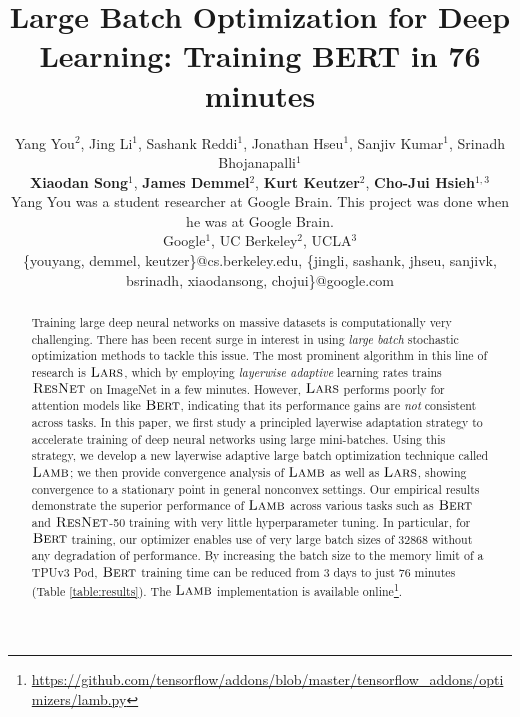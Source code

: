 \documentclass{article} %
\title{Large Batch Optimization for Deep Learning: Training BERT in 76 minutes}
\author{\small Yang You$^{2}$, 
Jing Li$^{1}$, Sashank Reddi$^{1}$, Jonathan Hseu$^{1}$, Sanjiv Kumar$^{1}$, Srinadh Bhojanapalli$^{1}$\\{\bf \small Xiaodan Song}$^{1}$, {\bf \small James Demmel}$^{2}$, {\bf \small Kurt Keutzer}$^{2}$, {\bf \small Cho-Jui Hsieh}$^{1,3}$\\
{\scriptsize Yang You was a student researcher at Google Brain. This project was done when he was at Google Brain.}
\\
\normalsize{Google$^{1}$},
\normalsize{UC Berkeley$^{2}$},
\normalsize{UCLA$^{3}$}\\
\scriptsize{\{youyang, demmel, keutzer\}@cs.berkeley.edu, \{jingli, sashank, jhseu, sanjivk, bsrinadh, xiaodansong, chojui\}@google.com}
}
\newcommand{\resnet}{\textsc{ResNet}}
\newcommand{\bert}{\textsc{Bert}\xspace}
\newcommand{\lamb}{\textsc{Lamb}}
\newcommand{\lars}{\textsc{Lars}}
\begin{document}
\maketitle

\begin{abstract}
Training large deep neural networks on massive datasets is  computationally very challenging. There has been recent surge in interest in using \emph{large batch} stochastic optimization methods to tackle this issue. The most prominent algorithm in this line of research is $\lars$, which by  employing \emph{layerwise adaptive} learning rates trains $\resnet$ on ImageNet in a few minutes. However, $\lars$ performs poorly for attention models like $\bert$, indicating that its performance gains are \emph{not} consistent across tasks. In this paper, we first study a principled layerwise adaptation strategy to accelerate training of deep neural networks using large mini-batches. Using this strategy, we develop a new layerwise adaptive large batch optimization technique called $\lamb$; we then provide convergence analysis of $\lamb$ as well as $\lars$, showing convergence to a stationary point in general nonconvex settings. Our empirical results demonstrate the superior performance of $\lamb$ across various tasks such as $\bert$ and $\resnet$-50 training with very little hyperparameter tuning. In particular, for $\bert$ training, our optimizer enables use of very large batch sizes of 32868 without any degradation of performance.  By increasing the batch size to the memory limit of a TPUv3 Pod, $\bert$ training time can be reduced from 3 days to just 76 minutes (Table \ref{table:results}). The $\lamb$ implementation is available online\footnote{\url{https://github.com/tensorflow/addons/blob/master/tensorflow_addons/optimizers/lamb.py}}.
\end{abstract}

\iffalse
Training large deep neural networks on massive datasets is  computationally very challenging. There has been recent surge in interest in using \emph{large batch} stochastic optimization methods to tackle this issue. The use of large batch of gradients (which are computed in parallel) in these methods enable them to use much larger learning rates, thereby, drastically reducing the training time. However, current methods require extensive tuning of learning rates and their performance gains are \emph{not} consistent across tasks. In this paper, we study a principled adaptation strategy to accelerate training of deep neural networks using large mini-batches. Using this strategy, we develop a new layer-wise adaptive large batch optimization technique called $\lamb$. We provide a formal convergence analysis of $\lamb$ as well as the previous published layerwise optimizer $\lars$, showing convergence to a stationary point in general nonconvex settings. Our empirical results demonstrate the superior performance of $\lamb$ across various tasks such as BERT and ResNet-50 training with very little tuning. In particular, for BERT training, our optimizer enables use of very large batch sizes of 32868 without any degradation of performance.  By increasing the batch size to the memory limit of a TPUv3 Pod, BERT training time can be reduced from 3 days to just 76 minutes (Table \ref{table:results}).
\fi
\end{document}
